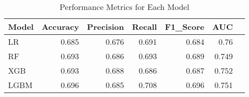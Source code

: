 \begin{table}[H]
\caption{Performance Metrics for Each Model}
\label{Table 3 :performance_metrics}
\begin{tabular}{lrrrrrr}
\toprule
Model & Accuracy & Precision & Recall & F1\_Score & AUC \\
\midrule
LR & 0.685 & 0.676 & 0.691 & 0.684 & 0.76 \\
RF & 0.693 & 0.686 & 0.693 & 0.689 & 0.749 \\
XGB & 0.693 & 0.688 & 0.686 & 0.687 & 0.752 \\
LGBM & 0.696 & 0.685 & 0.708 & 0.696 & 0.751 \\
\bottomrule
\end{tabular}
\end{table}
